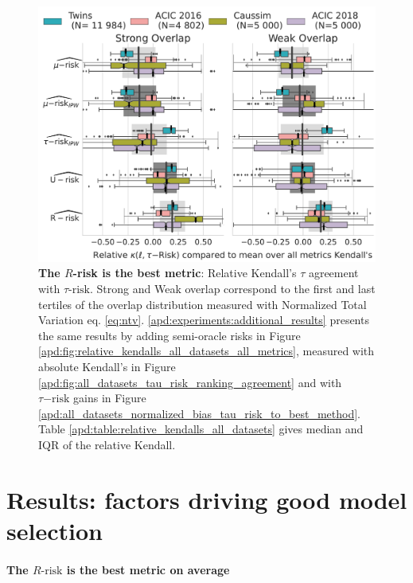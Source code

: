 \documentclass[a4paper,num-refs]{oup-contemporary}%
\begin{document}
\begin{figure}[!b]
    \centering\begin{minipage}{\linewidth}
        \includegraphics[width=\linewidth]{_1_r_risk_domination_mrisks_by_ds_feasible.pdf}
    \end{minipage}
    \caption{\textbf{The $R$-risk is the best metric}: Relative Kendall's $\tau$ agreement with $\tau\text{-risk}$.
        Strong and Weak overlap correspond to the first and last tertiles of the overlap distribution measured with
        Normalized Total Variation eq. \ref{eq:ntv}. \ref{apd:experiments:additional_results} presents the same results
        by adding semi-oracle risks in Figure \ref{apd:fig:relative_kendalls_all_datasets_all_metrics}, measured with
        absolute Kendall's in Figure \ref{apd:fig:all_datasets_tau_risk_ranking_agreement} and with $\tau\mathrm{-risk}$
        gains in Figure \ref{apd:all_datasets_normalized_bias_tau_risk_to_best_method}. Table
        \ref{apd:table:relative_kendalls_all_datasets} gives median and
        IQR of the relative Kendall.}\label{fig:relative_kendalls_all_datasets}
\end{figure}



\section{Results: factors driving good model selection}\label{empirical_study:results}


\paragraph{The $R\text{-risk}$ is the best metric on average}
\end{document}
